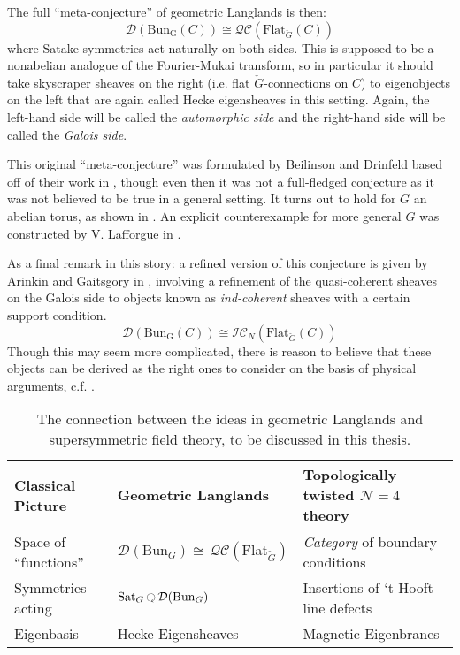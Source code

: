The full ``meta-conjecture'' of geometric Langlands is then:
\begin{equation}
	\mathcal D (\mathrm{Bun_G}(C)) \cong \mathcal{QC} (\mathrm{Flat}_{\check G} (C))
\end{equation}
where Satake symmetries act naturally on both sides. This is supposed to be a nonabelian analogue of the Fourier-Mukai transform, so in particular it should take skyscraper sheaves on the right (i.e. flat $\check G$-connections on $C$) to eigenobjects on the left that are again called Hecke eigensheaves in this setting. Again, the left-hand side will be called the \emph{automorphic side} and the right-hand side will be called the \emph{Galois side}.

This original ``meta-conjecture'' was formulated by Beilinson and Drinfeld based off of their work in \cite{beilinson1991}, though even then it was not a full-fledged conjecture as it was not believed to be true in a general setting. It turns out to hold for $G$ an abelian torus, as shown in \cite{laumon1996}.
An explicit counterexample for more general $G$ was constructed by V. Lafforgue in \cite{lafforgue2009}.

As a final remark in this story: a refined version of this conjecture is given by Arinkin and Gaitsgory in \cite{arinkin2015}, involving a refinement of the quasi-coherent sheaves on the Galois side to objects known as \emph{ind-coherent} sheaves with a certain support condition. 
\begin{equation}
	\mathcal D (\mathrm{Bun_G}(C)) \cong \mathcal{IC}_{N} (\mathrm{Flat}_{\check G} (C))
\end{equation}
Though this may seem more complicated, there is reason to believe that these objects can be derived as the right ones to consider on the basis of physical arguments, c.f. \cite{elliott2017}. 

\begin{table}[h!]
	\centering
\begin{tabularx}{\textwidth}{|>{\hsize}Y|>{\hsize}Y|Y|}
	\hline
	Classical Picture & Geometric Langlands & Topologically twisted $\mathcal N=4$ theory\\
	\hline
	Space of ``functions'' & $\mathcal D (\mathrm{Bun}_G) \cong \, \mathcal{QC}(\mathrm{Flat}_{\check G})$ & \emph{Category} of boundary conditions \\
	Symmetries acting & $\mathrm{Sat}_G \lacts \mathcal D (\mathrm{Bun}_G)$ & Insertions of `t Hooft line defects\\
	Eigenbasis & Hecke Eigensheaves & Magnetic Eigenbranes\\
	\hline
	\end{tabularx}
\caption{The connection between the ideas in geometric Langlands and supersymmetric field theory, to be discussed in this thesis.}
\label{tab:langlands_and_physics}
\end{table}


